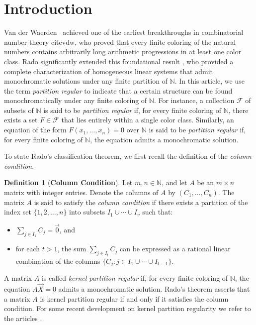 \documentclass{article}
\theoremstyle{Theorem}
\theoremstyle{definition}
\newtheorem{defn}[thm]{Definition}
\begin{document}
\section{Introduction}
Van der Waerden \ achieved one of the earliest breakthroughs in combinatorial number theory cite{vdw}, who proved that every finite coloring of the natural numbers contains arbitrarily long arithmetic progressions in at least one color class. Rado significantly extended this foundational result \cite{rado}, who provided a complete characterization of homogeneous linear systems that admit monochromatic solutions under any finite partition of \( \mathbb{N} \). In this article, we use the term \emph{partition regular} to indicate that a certain structure can be found monochromatically under any finite coloring of \( \mathbb{N} \). For instance, a collection \( \mathcal{F} \) of subsets of \( \mathbb{N} \) is said to be \emph{partition regular} if, for every finite coloring of \( \mathbb{N} \), there exists a set \( F \in \mathcal{F} \) that lies entirely within a single color class. Similarly, an equation of the form \( F(x_1, \ldots, x_n) = 0 \) over \( \mathbb{N} \) is said to be \emph{partition regular} if, for every finite coloring of \( \mathbb{N} \), the equation admits a monochromatic solution.




To state Rado's classification theorem, we first recall the definition of the \emph{column condition}.

\begin{defn}[\textbf{Column Condition}]
Let \( m, n \in \mathbb{N} \), and let \( A \) be an \( m \times n \) matrix with integer entries. Denote the columns of \( A \) by \( (C_1, \ldots, C_n) \). The matrix \( A \) is said to satisfy the \emph{column condition} if there exists a partition of the index set \( \{1, 2, \ldots, n\} \) into subsets \( I_1 \cup \cdots \cup I_v \) such that:
\begin{itemize}
    \item \( \sum_{j \in I_1} C_j = \vec{0} \), and
    \item for each \( t > 1 \), the sum \( \sum_{j \in I_t} C_j \) can be expressed as a rational linear combination of the columns \( \{ C_j : j \in I_1 \cup \cdots \cup I_{t-1} \} \).
\end{itemize}
\end{defn}

A matrix \( A \) is called \emph{kernel partition regular} if, for every finite coloring of \( \mathbb{N} \), the equation \( A\vec{X} = 0 \) admits a monochromatic solution. Rado's theorem asserts that a matrix \( A \) is kernel partition regular if and only if it satisfies the column condition. For some recent development on kernel partition regularity we refer to the articles \cite{new2, new1}.
\end{document}
